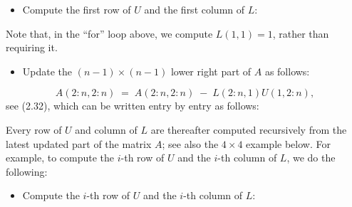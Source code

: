 \begin{itemize}
\item[$\bullet$] Compute the first row of $U$ and the first column of $L$:
\end{itemize}

\begin{center}
\end{center}

Note that, in the ``for'' loop above, we compute $L(1,1) = 1$, rather
than requiring it.

\begin{itemize}
\item[$\bullet$] Update the $(n-1)\times(n-1)$ lower right part of $A$ as follows:
\end{itemize}
\begin{equation}
A(2:n,2:n) \;=\; A(2:n,2:n) \;-\; L(2:n,1)U(1,2:n),
\end{equation}
see (2.32), which can be written entry by entry as follows:

\begin{center}
\end{center}

Every row of $U$ and column of $L$ are thereafter computed recursively
from the latest updated part of the matrix $A$; see also the $4\times4$
example below. For example, to compute the $i$-th row of $U$ and the
$i$-th column of $L$, we do the following:

\begin{itemize}
\item[$\bullet$] Compute the $i$-th row of $U$ and the $i$-th column of $L$:
\end{itemize}
